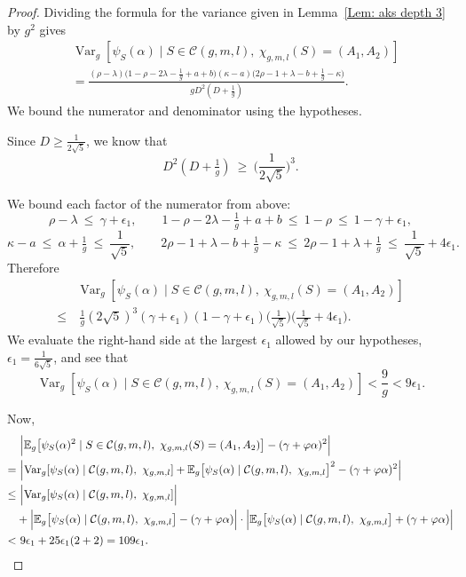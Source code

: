 \documentclass[12pt]{amsart}
\def\E{{\mathbb E}}
\renewcommand{\phi}{\varphi}
\newcommand{\cC}{\mathcal{C}}
\def\Var{{\operatorname{Var}}}
\begin{document}
\begin{proof}
Dividing the formula for the variance given in Lemma~\ref{Lem: aks depth 3} by $g^2$ gives
\begin{align*}
&\Var_g[\psi_S(\alpha)\mid S\in\cC(g,m,l),\ \chi_{g,m,l}(S)=(A_1,A_2)]\\
&=\frac{(\rho-\lambda)\bigl(1-\rho-2\lambda-\tfrac1g+a+b\bigr)
(\kappa-a)\bigl(2\rho-1+\lambda-b+\tfrac1g-\kappa\bigr)}
{gD^2(D+\tfrac1g)}.    
\end{align*}
We bound the numerator and denominator using the hypotheses.


Since $D\geq \frac{1}{2\sqrt{5}}$, we know that
\[D^2(D+\tfrac1g)\ \ge\ \Big(\frac1{2\sqrt5}\Big)^3.\]

We bound each factor of the numerator from above:
\[
\rho-\lambda\ \le\ \gamma+\epsilon_1,\qquad
1-\rho-2\lambda-\tfrac1g+a+b\ \le\ 1-\rho\ \le\ 1-\gamma+\epsilon_1,
\]
\[
\kappa-a\ \le\ \alpha+\tfrac1g\ \le\ \frac1{\sqrt5},\qquad
2\rho-1+\lambda-b+\tfrac1g-\kappa\ \le\ 2\rho-1+\lambda+\tfrac1g
\ \le\ \frac1{\sqrt5}+4\epsilon_1.
\]
Therefore
\begin{align*}
&\Var_g[\psi_S(\alpha)\mid S\in\cC(g,m,l),\ \chi_{g,m,l}(S)=(A_1,A_2)]\\
\le &\ \frac{1}{g}(2\sqrt5)^3
(\gamma+\epsilon_1)(1-\gamma+\epsilon_1)\Big(\frac1{\sqrt5}\Big)
\Big(\frac1{\sqrt5}+4\epsilon_1\Big).
\end{align*}
We evaluate the right-hand side at the largest $\epsilon_1$ allowed by our hypotheses, 
$\epsilon_1=\frac{1}{6\sqrt5}$, and see that
\[
\Var_g[\psi_S(\alpha)\mid S\in\cC(g,m,l),\ \chi_{g,m,l}(S)=(A_1,A_2)]<\frac{9}{g}< 9\epsilon_1.
\]

Now,
\begin{align*}
&\  \Bigl|\E_g \big[\psi_S(\alpha)^2\mid S\in\cC(g,m,l),\ \chi_{g,m,l}(S)=(A_1,A_2)\big]-(\gamma+\phi\alpha)^2\Bigr|\\
= &\  \Bigl| \Var_g[\psi_S(\alpha)\mid \cC(g,m,l),\ \chi_{g,m,l}] +\E_g \big[\psi_S(\alpha)\mid \cC(g,m,l),\ \chi_{g,m,l}\big]^2 -(\gamma+\phi\alpha)^2\Bigr|\\
\leq &\ \Bigl| \Var_g[\psi_S(\alpha)\mid \cC(g,m,l),\ \chi_{g,m,l}] \Bigr|\\
 &+\Bigl|\E_g \big[\psi_S(\alpha)\mid \cC(g,m,l),\ \chi_{g,m,l}\big] -(\gamma+\phi\alpha)\Bigr|
\cdot \Bigl|\E_g \big[\psi_S(\alpha)\mid \cC(g,m,l),\ \chi_{g,m,l}\big] +(\gamma+\phi\alpha)\Bigr|\\
< &\ 9\epsilon_1 + 25\epsilon_1 (2+2)
=109\epsilon_1.\qedhere
\end{align*}
\end{proof}
\end{document}
